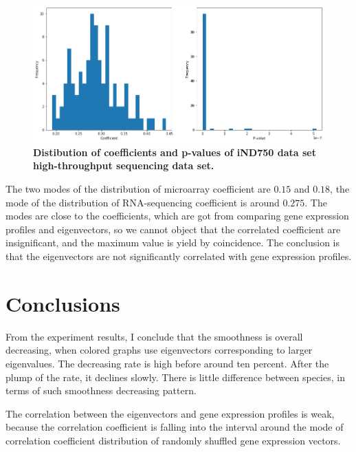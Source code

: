 \documentclass{article} %
\begin{document}
\begin{figure}[H]
      \graphicspath{ {images/} }
      \begin{center}
            \includegraphics[scale=0.4]{images/coe-distr-rna.png}
      \end{center}
      \caption{\textbf{Distibution of coefficients and p-values of iND750 data set high-throughput sequencing data set.} }
      \label{fig:coe-distr-rna}
\end{figure}

The two modes of the distribution of microarray coefficient are $0.15$ and $0.18$, the mode of the distribution of RNA-sequencing coefficient is around $0.275$. The modes are close to the coefficients, which are got from comparing gene expression profiles and eigenvectors, so we cannot object that the correlated coefficient are insignificant, and the maximum value is yield by coincidence. The conclusion is that the eigenvectors are not significantly correlated with gene expression profiles.

\section{Conclusions} \label{section:conclusions}
From the experiment results, I conclude that the smoothness is overall decreasing, when colored graphs use eigenvectors corresponding to larger eigenvalues. The decreasing rate is high before around ten percent. After the plump of the rate, it declines slowly. There is little difference between species, in terms of such smoothness decreasing pattern. 

The correlation between the eigenvectors and gene expression profiles is weak, because the correlation coefficient is falling into the interval around the mode of correlation coefficient distribution of randomly shuffled gene expression vectors.
\end{document}
